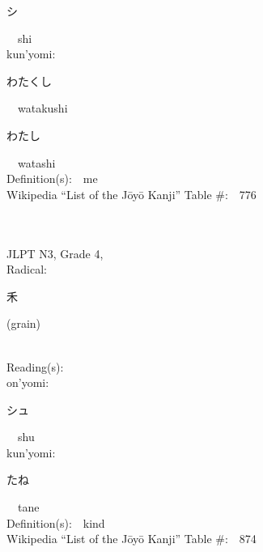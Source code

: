 \begin{multicols}{2}
{\hspace*{2em}}{\begin{CJK}{UTF8}{min} シ \end{CJK}}\ \ shi\ \ \\
{\hspace*{1em}}kun'yomi:\ \ \\
{\hspace*{2em}}{\begin{CJK}{UTF8}{min} わたくし \end{CJK}}\ \ watakushi\ \ \\
{\hspace*{2em}}{\begin{CJK}{UTF8}{min} わたし \end{CJK}}\ \ watashi\ \ \\
Definition(s):\ \ me \\
Wikipedia ``List of the J\=oy\=o Kanji'' Table \#:\ \ 776 \\
\ \ \\
{\fontsize{34pt}{40pt}  }\ \ \\  %
{JLPT N3, Grade 4, \\Radical:\ \ {\begin{CJK}{UTF8}{min} 禾 \end{CJK}} (grain) } \\
Reading(s):\ \ \\
{\hspace*{1em}}on'yomi:\ \ \\
{\hspace*{2em}}{\begin{CJK}{UTF8}{min} シュ \end{CJK}}\ \ shu\ \ \\
{\hspace*{1em}}kun'yomi:\ \ \\
{\hspace*{2em}}{\begin{CJK}{UTF8}{min} たね \end{CJK}}\ \ tane\ \ \\
Definition(s):\ \ kind \\
Wikipedia ``List of the J\=oy\=o Kanji'' Table \#:\ \ 874 \\
\ \ \\
{\fontsize{34pt}{40pt}  }\ \ \\  %

\end{multicols}

